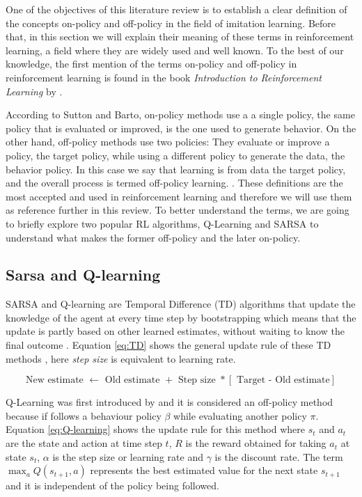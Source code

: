 One of the objectives of this literature review is to establish a clear definition of the concepts on-policy and off-policy in the field of imitation learning. Before that, in this section we will explain their meaning of these terms in reinforcement learning, a field where they are widely used and well known. To the best of our knowledge, the first mention of the terms on-policy and off-policy in reinforcement learning is found in the book \textit{Introduction to Reinforcement Learning} by \cite{Sutton:1998}.

According to Sutton and Barto, on-policy methods use a a single policy, the same policy that is evaluated or improved, is the one used to generate behavior. On the other hand, off-policy methods use two policies: They evaluate or improve a policy, the target policy, while using a different policy to generate the data, the behavior policy. In this case we say that learning is from data  the target policy, and the overall process is termed off-policy learning. \cite{Sutton:1998}. These definitions are the most accepted and used in reinforcement learning and therefore we will use them as reference further in this review. To better understand the terms, we are going to briefly explore two popular RL algorithms, Q-Learning and SARSA to understand what makes the former off-policy and the later on-policy.

\subsection*{Sarsa and Q-learning}
SARSA and Q-learning are Temporal Difference (TD) algorithms that update the knowledge of the agent at every time step by bootstrapping which means that the update is partly based on other learned estimates, without waiting to know the final outcome \cite{Sutton:1998}. Equation \ref{eq:TD} shows the general update rule of these TD methods \cite{TD:equation:2019}, here \textit{step size} is equivalent to learning rate.


\begin{equation}
\text{New estimate } \leftarrow \text{ Old estimate }+ \text{ Step size }* \left[\text{ Target - Old estimate} \right]
\label{eq:TD}
\end{equation}

Q-Learning was first introduced by \cite{Watkins:1989} and it is considered an off-policy method because if follows a behaviour policy $\beta$ while evaluating another policy $\pi$. Equation \ref{eq:Q-learning} shows the update rule for this method where $s_t$ and $a_t$ are the state and action at time step $t$, $R$ is the reward obtained for taking $a_t$ at state $s_t$, $\alpha$ is the step size or learning rate and $\gamma$ is  the discount rate. The term $\max_{a} Q(s_{t+1}, a)$ represents  the best estimated value for the next state $s_{t+1}$ and it is independent of the policy being followed.

